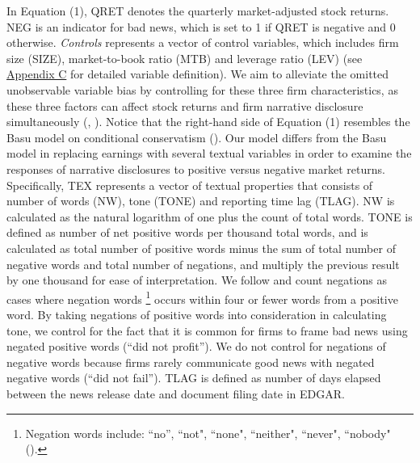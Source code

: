 \documentclass[a4paper]{article}
\begin{document}
\begin{spacing}{2}
In Equation (1), QRET denotes the quarterly market-adjusted stock returns. NEG is an indicator for bad news, which is set to 1 if QRET is negative and 0 otherwise. \textit{Controls} represents a vector of control variables, which includes firm size (SIZE), market-to-book ratio (MTB) and leverage ratio (LEV) (see \hyperref[appc]{Appendix C} for detailed variable definition). We aim to alleviate the omitted unobservable variable bias by controlling for these three firm characteristics, as these three factors can affect stock returns and firm narrative disclosure simultaneously (\cite{liInformationContentForwardLooking2010}, \cite{huangToneManagement2014}). %
Notice that the right-hand side of Equation (1) resembles the Basu model on conditional conservatism (\cite{basuConservatismPrincipleAsymmetric1997}). Our model differs from the Basu model in replacing earnings with several textual variables in order to examine the responses of narrative disclosures to positive versus negative market returns. Specifically, TEX represents a vector of textual properties that consists of number of words (NW), tone (TONE) and reporting time lag (TLAG). NW is calculated as the natural logarithm of one plus the count of total words. TONE is defined as number of net positive words per thousand total words, and is calculated as total number of positive words minus the sum of total number of negative words and total number of negations, and multiply the previous result by one thousand for ease of interpretation. We follow \cite{loughranWhenLiabilityNot2011} and count negations as cases where negation words \footnote{Negation words include: “no”, “not", “none", “neither", “never", “nobody" (\cite{tottieNegationEnglishSpeech1991}).} occurs within four or fewer words from a positive word. By taking negations of positive words into consideration in calculating tone, we control for the fact that it is common for firms to frame bad news using negated positive words (“did not profit”). We do not control for negations of negative words because firms rarely communicate good news with negated negative words (“did not fail”). TLAG is defined as number of days elapsed between the news release date and document filing date in EDGAR.


\end{spacing}
\end{document}
